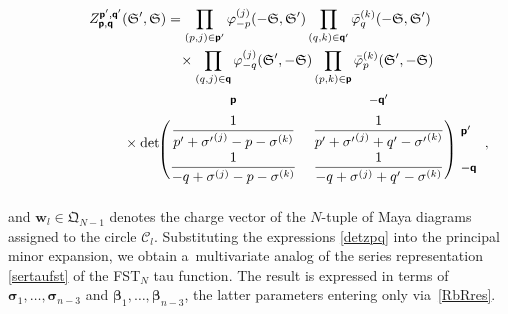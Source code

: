 \documentclass[pdftex]{sigma}
\numberwithin{equation}{section}
\begin{document}
\begin{gather}
Z^{\boldsymbol{\mathsf p}',\boldsymbol{\mathsf q}'}_{\boldsymbol{\mathsf p},\boldsymbol{\mathsf q}}(\mathfrak S', \mathfrak S)
= \prod_{(p,j)\in\boldsymbol{\mathsf p}'} \varphi_{-p}^{(j)}(-\mathfrak S,\mathfrak S')
\prod_{(q,k)\in\boldsymbol{\mathsf q}'}\bar\varphi_{q}^{(k)}(-\mathfrak S,\mathfrak S')\nonumber\\
\hphantom{Z^{\boldsymbol{\mathsf p}',\boldsymbol{\mathsf q}'}_{\boldsymbol{\mathsf p},\boldsymbol{\mathsf q}}(\mathfrak S', \mathfrak S)=}{}
\times \prod_{(q,j)\in\boldsymbol{\mathsf q}} \varphi_{-q}^{(j)}(\mathfrak S',-\mathfrak S)
\prod_{(p,k)\in\boldsymbol{\mathsf p}} \bar\varphi_{p}^{(k)}(\mathfrak S',-\mathfrak S) \nonumber\\
\hphantom{Z^{\boldsymbol{\mathsf p}',\boldsymbol{\mathsf q}'}_{\boldsymbol{\mathsf p},\boldsymbol{\mathsf q}}(\mathfrak S', \mathfrak S)=}{} \times
\det
\begin{blockarray}{ccl}
{\text{\footnotesize$\boldsymbol{\mathsf p}$}} & {\text{\footnotesize$-\boldsymbol{\mathsf q}'$}} \vspace{0.2cm} \\
\begin{block}{(cc)l}
\displaystyle \frac{1}{p'+{\sigma'}^{(j)}-p-\sigma^{(k)}} &
\displaystyle \frac1{p'+{\sigma'}^{(j)}+q'-{\sigma'}^{(k)}} & {\text{\footnotesize$\boldsymbol{\mathsf p}'$}} \vspace{0.1cm} \\
\displaystyle \frac1{-q+\sigma^{(j)}-p-\sigma^{(k)}} &
\displaystyle \frac{1}{-q+\sigma^{(j)}+q'-{\sigma}^{(k)}} & {\text{\footnotesize$-\boldsymbol{\mathsf q}$}} \\
\end{block}
\end{blockarray},\label{detzpqnorm}
\end{gather}
and $\boldsymbol{w}_l\in\mathfrak{Q}_{N-1}$ denotes the charge vector of the $N$-tuple of Maya diagrams assigned to the circle $\mathcal C_l$. Substituting the expressions \eqref{detzpq} into the principal minor expansion, we obtain a~multivariate analog of the series representation \eqref{sertaufst} of the FST$_N$ tau function. The result is expressed in terms of $\boldsymbol{\sigma}_1,\ldots, \boldsymbol{\sigma}_{n-3}$ and $\boldsymbol{\beta}_1,\ldots, \boldsymbol{\beta}_{n-3}$, the latter parameters entering only via~\eqref{RbRres}.

\appendix
\end{document}
